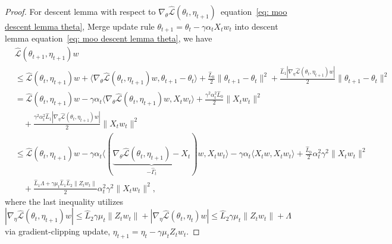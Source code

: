 \documentclass[twoside]{article} %
\def\eqref#1{equation~\ref{#1}}
\theoremstyle{plain}
\theoremstyle{definition}
\theoremstyle{remark}
\newcommand{\HGamma}{\hat{\Gamma}}
\newcommand{\hL}{\hat{L}}
\newcommand{\fhL}{\hat{\mathcal{L}}}
\begin{document}
\begin{proof}
For descent lemma with respect to $\nabla_{\theta}\fhL(\theta_t, \eta_{t+1})$~\eqref{eq: moo descent lemma theta}, Merge update rule $\theta_{t+1} = \theta_{t}-\gamma\alpha_tX_tw_t$ into descent lemma \eqref{eq: moo descent lemma theta}, we have
\begin{align}
    &\fhL({\theta}_{t+1}, {\eta}_{t+1}){w}\nonumber\\
    &\leq \fhL({\theta}_{t}, {\eta}_{t+1}){w} + \langle \nabla_{\theta}\fhL({\theta}_{t}, {\eta}_{t+1})w,{\theta}_{t+1}-{\theta}_t \rangle + \frac{\hL_0}{2}\|{\theta}_{t+1}-{\theta}_t \|^2+ \frac{\hL_1 | \nabla_{\eta} \fhL({\theta}_t, {\eta}_{t+1})w|}{2}\|{\theta}_{t+1}-{\theta}_t \|^2  \nonumber \\
    &=  \fhL({\theta}_t, {\eta}_{t+1}){w} -\gamma\alpha_t \langle \nabla_{\theta}\fhL({\theta}_t, {\eta}_{t+1})w,X_tw_t \rangle + \frac{\gamma^2\alpha_t^2\hL_0}{2}\|X_tw_t\|^2 \nonumber\\
    &\quad + \frac{\gamma^2\alpha_t^2\hL_1 | \nabla_{\eta} \fhL({\theta}_t, {\eta}_{t+1})w|}{2} \|X_tw_t\|^2\nonumber\\
    &\leq \fhL({\theta}_t, {\eta}_{t+1}){w} -\gamma\alpha_t \langle (\underbrace{\nabla_{\theta}\fhL({\theta}_t, {\eta}_{t+1})-{{X}_t}}_{-\HGamma_t})w,X_tw_t \rangle - \gamma\alpha_t \langle {{X}_tw},X_tw_t \rangle+ \frac{\hL_0}{2}\alpha_t^2\gamma^2\|X_tw_t\|^2  \nonumber\\
    &\quad  + \frac{\hL_1\Lambda+{\gamma\mu_t\hL_1\hL_2\|Z_tw_t\|}}{2}\alpha_t^2\gamma^2\| X_tw_t \|^2,
    \label{eq: coro descent 2}
\end{align}
where the last inequality utilizes  $|\nabla_{\eta} \fhL(\theta_t, \eta_{t+1})w|\leq \hL_2\gamma\mu_t\|Z_tw_t\| + |\nabla_{\eta}\fhL(\theta_t, \eta_t)w|\leq\hL_2\gamma\mu_t\|Z_tw_t\|+\Lambda$ via gradient-clipping update,
$\eta_{t+1}=\eta_t-\gamma\mu_tZ_tw_t$.


\end{proof}
\end{document}
